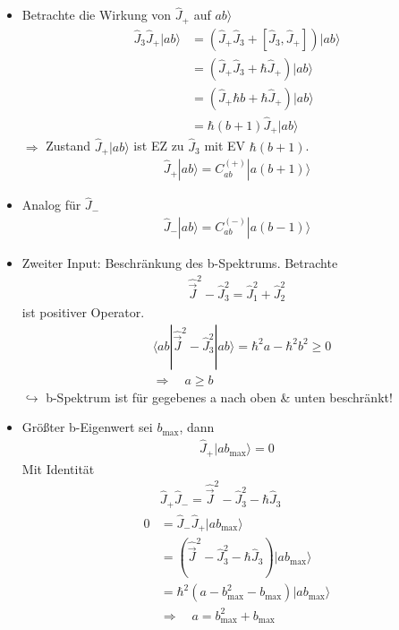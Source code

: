 \documentclass[10pt,article,colorback,accentcolor=tud9d]{scrartcl}
\begin{document}
\begin{itemize}
	\item Betrachte die Wirkung von $\hat{J}_+$ auf $ab\rangle$
    \begin{align}
    \hat{J}_3\hat{J}_+|ab\rangle&=(\hat{J}_+\hat{J}_3+[\hat{J}_3,\hat{J}_+])|ab\rangle\\
    &=(\hat{J}_+\hat{J}_3+\hbar\hat{J}_+)|ab\rangle\\
    &=(\hat{J}_+\hbar b+\hbar\hat{J}_+)|ab\rangle\\
    &=\hbar(b+1)\hat{J}_+|ab\rangle
    \end{align}
    $\Rightarrow$ Zustand $\hat{J}_+|ab\rangle$ ist EZ zu $\hat{J}_3$ mit EV $\hbar(b+1)$.
    \begin{align}
    \hat{J}_+|ab\rangle=C_{ab}^{(+)}|a(b+1)\rangle
    \end{align}
  \item Analog für $\hat{J}_-$
    \begin{align}
    \hat{J}_-|ab\rangle=C_{ab}^{(-)}|a(b-1)\rangle
    \end{align}
  \item Zweiter Input: Beschränkung des b-Spektrums. Betrachte
    \begin{align}
    \hat{\vec{J}}^2-\hat{J}^2_3=\hat{J}^2_1+\hat{J}^2_2
    \end{align}
    ist positiver Operator.
    \begin{align}
    &\langle ab|\hat{\vec{J}}^2-\hat{J}^2_3|ab\rangle=\hbar^2a-\hbar^2b^2\geq0\\
    &\Rightarrow \quad a\geq b
    \end{align}
    $\hookrightarrow$ b-Spektrum ist für gegebenes a nach oben \& unten beschränkt!
  \item Größter b-Eigenwert sei $b_{\text{max}}$, dann
    \begin{align}
    \hat{J}_+|ab_{\text{max}}\rangle=0
    \end{align}
    Mit Identität
    \begin{align}
    &\hat{J}_+\hat{J}_-=\hat{\vec{J}}^2-\hat{J}^2_3-\hbar\hat{J}_3\\
    0&=\hat{J}_-\hat{J}_+|ab_{\text{max}}\rangle\\
    &=(\hat{\vec{J}}^2-\hat{J}_3^2-\hbar\hat{J}_3)|ab_{\text{max}}\rangle\\
    &=\hbar^2(a-b_\text{max}^2-b_\text{max})|ab_\text{max}\rangle\\
    &\Rightarrow \quad a=b_\text{max}^2+b_\text{max}
    \end{align}

\end{itemize}
\end{document}
